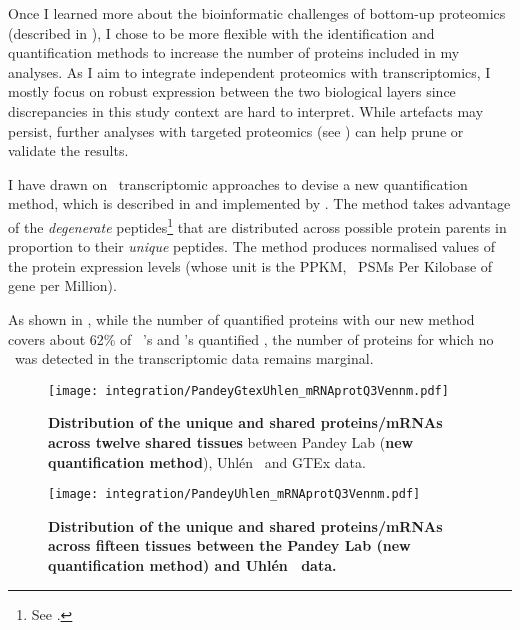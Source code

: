 Once I learned more about the bioinformatic challenges of bottom-up proteomics
(described in ),
I chose to be more flexible with the identification and quantification methods
to increase the number of proteins included in my analyses.
As I aim to integrate independent proteomics with transcriptomics,
I mostly focus on robust expression between the two biological layers
since discrepancies in this study context are hard to interpret.
While artefacts may persist,
further analyses with targeted proteomics (see )
can help prune or validate the results.\mybr\

I have drawn on \Rnaseq\ transcriptomic approaches to devise
a new quantification method, which is described in 
and implemented by \james.
The method takes advantage of the \emph{degenerate} peptides\footnote{%
See .}
that are distributed across possible protein parents
in proportion to their \emph{unique} peptides.
The method produces normalised values of the protein expression levels
(whose unit is the \gls{PPKM}, \ie\ \glspl{PSM} Per Kilobase of gene per Million).\mybr\

As shown in ,
while the number of quantified proteins
with our new method
covers about 62\% of \uhlen\ \etal{}'s and \gtex{}'s quantified \mRNAs,
the number of proteins for which no \mRNA\ was detected
in the transcriptomic data remains marginal.\mybr\

\begin{figure}[!htpb]
    \texttt{[image: integration/PandeyGtexUhlen\_mRNAprotQ3Vennm.pdf]}\centering
    \caption[Distribution of the unique and shared proteins/mRNAs
    across the three datasets and twelve tissues
    (new protein quantification method)]{\label{fig:PGU_venQ3}%
    \textbf{Distribution of the unique and shared proteins/mRNAs
    across twelve shared tissues} between  Pandey Lab
    (\textbf{new quantification method}),
    Uhlén \etal\ and GTEx data.}
\end{figure}

\begin{figure}[!htpb]
    \texttt{[image: integration/PandeyUhlen\_mRNAprotQ3Vennm.pdf]}\centering
    \caption[Distribution of the unique and shared proteins/mRNAs
    ahlcross fifteen tissues between Pandey Lab (new quantification method)
    and Uhlén \textit{et al.} data]{\label{fig:PU_vennQ3}\textbf{Distribution of the
    unique and shared proteins/mRNAs across fifteen tissues between
    the Pandey Lab (new quantification method)
    and Uhlén \etal\ data.}}
\end{figure}

